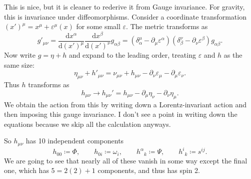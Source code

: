 This is nice, but it is cleaner to rederive it from Gauge invariance. For gravity, this is invariance under diffeomorphisms. Consider a coordinate transformation $(x')^\mu =x^\mu +\varepsilon ^{\mu } (x)$ for some small $\varepsilon $. The metric transforms as
\[
	g'_{\mu \nu } = \frac{\mathrm{d}x^\alpha }{\mathrm{d}(x')^\mu } \frac{\mathrm{d}x^\beta }{\mathrm{d}(x')^\nu } g_{\alpha \beta } = \left( \delta ^\mu _\alpha -\partial _\mu \varepsilon ^\alpha  \right) \left( \delta _\beta ^\nu -\partial _\nu \varepsilon  ^\beta  \right) g_{\alpha \beta } 
.\]
Now write $g=\eta +h$ and expand to the leading order, treating $\varepsilon $ and $h$ as the same size:
\[
	\eta _{\mu \nu } +h'_{\mu \nu } =\nu _{\mu \nu } +h_{\mu \nu } -\partial _\nu \varepsilon _\mu -\partial _\mu \varepsilon _\nu 
.\]
Thus $h$ transforms as
\[
	h_{\mu \nu } \to h_{\mu \nu } ' = h_{\mu \nu } -\partial_\mu \eta _\nu -\partial _\nu \eta _\mu 
.\]
We obtain the action from this by writing down a Lorentz-invariant action and then imposing this gauge invariance. I don't see a point in writing down the equations because we skip all the calculation anyways.

So $h_{\mu \nu } $ has 10 independent components
\[
	h_{00} \coloneqq \Phi ,\qquad h_{0i} \coloneqq \omega _i,\qquad h^\alpha \!_k \coloneqq \Psi ,\qquad h^i\!_k \coloneqq s^{ij} 
.\]
We are going to see that nearly all of these vanish in some way except the final one, which has $5=2(2) + 1$ components, and thus has spin 2.
